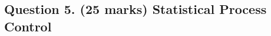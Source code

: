 \documentclass[a4paper,12pt]{article}
\begin{document}

\newpage
\subsection*{Question 5. (25 marks) Statistical Process Control }

\end{document}
